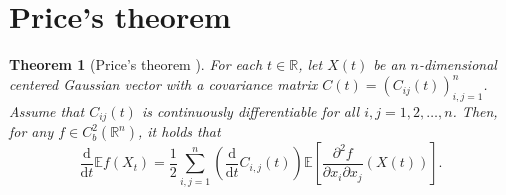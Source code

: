 \documentclass[11pt]{article}
\newtheorem{theorem}{Theorem}[section]
\numberwithin{equation}{section}
\newcommand{\E}{\mathbb{E}}
\newcommand{\1}{\mathbf 1}
\begin{document}
\section{Price's theorem}\label{sec:Price}

\begin{theorem}[Price's theorem \cite{Price}]\label{thm:Price}
For each $t\in {\mathbb R}$, let $X(t)$ be an $n$-dimensional centered Gaussian vector with a covariance matrix $C(t) = (C_{ij}(t))_{i,j =1}^n$.
Assume that $C_{ij}(t)$ is continuously differentiable for all $i,j =1,2, \dots ,n$. 
Then, for any $f\in C_b^2 ({\mathbb R}^n)$, it holds that %
\[
\frac{\mathrm d}{\mathrm dt} \E f(X_t) = \frac{1}{2} \sum _{i,j =1}^n \left( \frac{\mathrm d}{\mathrm dt} C_{i,j}(t)\right) \E \left[ \frac{\partial ^2 f}{\partial x_i \partial x_j} (X(t)) \right] .
\]
\end{theorem}
\end{document}
